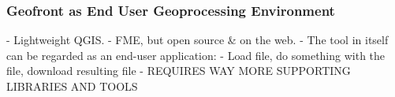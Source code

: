 \subsubsection{Geofront as End User Geoprocessing Environment}
- Lightweight QGIS.
- FME, but open source \& on the web.
- The tool in itself can be regarded as an end-user application:
  - Load file, do something with the file, download resulting file
  - REQUIRES WAY MORE SUPPORTING LIBRARIES AND TOOLS














